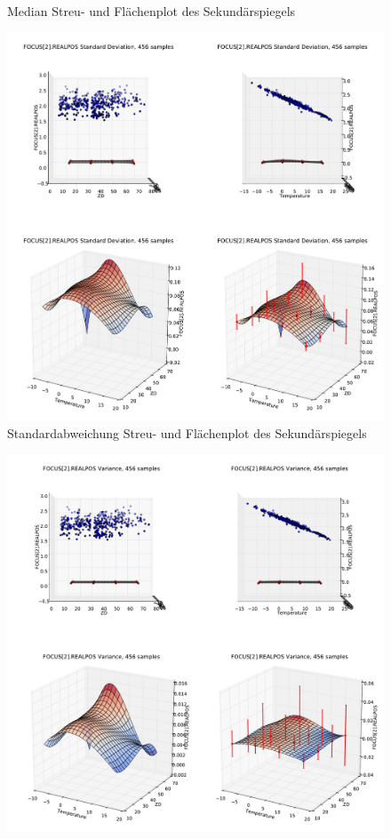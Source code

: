 \begin{appendix}
\begin{figure}[H]
	\caption[Median Streu- und Flächenplot des Sekundärspiegels]{Median Streu- und Flächenplot des Sekundärspiegels}
    \label{foc_med}
\end{figure}
\begin{figure}[H]
	\centering
	\includegraphics[scale=.44]{tsi_surf/POSITION_INSTRUMENTAL_FOCUS_2__REALPOS_std.pdf}
	\caption[Standardabweichung Streu- und Flächenplot des Sekundärspiegels]{Standardabweichung Streu- und Flächenplot des Sekundärspiegels}
    \label{foc_std}
\end{figure}
\begin{figure}[H]
	\centering
	\includegraphics[scale=.44]{tsi_surf/POSITION_INSTRUMENTAL_FOCUS_2__REALPOS_var.pdf}

\end{figure}
\end{appendix}
